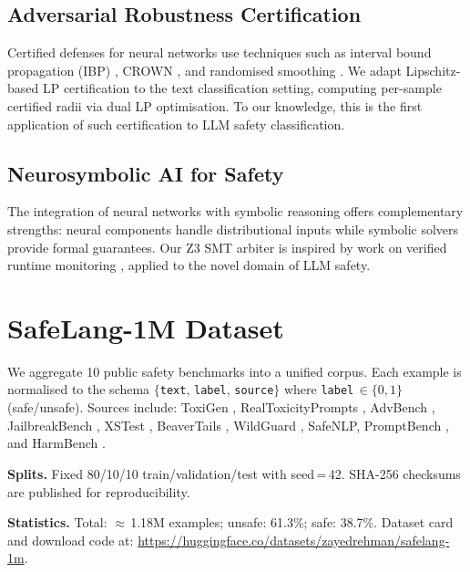 \documentclass[conference]{IEEEtran}
\begin{document}
\subsection{Adversarial Robustness Certification}
Certified defenses for neural networks use techniques such as interval bound
propagation (IBP) \cite{gowal2018effectiveness}, CROWN \cite{zhang2018efficient},
and randomised smoothing \cite{cohen2019certified}. We adapt
Lipschitz-based LP certification \cite{weng2018towards} to the text
classification setting, computing per-sample certified radii via dual LP
optimisation. To our knowledge, this is the first application of such
certification to LLM safety classification.

\subsection{Neurosymbolic AI for Safety}
The integration of neural networks with symbolic reasoning
\cite{garcez2022neural} offers complementary strengths: neural components
handle distributional inputs while symbolic solvers provide formal guarantees.
Our Z3 SMT arbiter is inspired by work on verified runtime monitoring
\cite{pnueli1977temporal}, applied to the novel domain of LLM safety.

\section{SafeLang-1M Dataset}
\label{sec:dataset}

We aggregate 10 public safety benchmarks into a unified corpus. Each example
is normalised to the schema $\{$\texttt{text}, \texttt{label}, \texttt{source}$\}$
where \texttt{label}\,$\in\{0,1\}$ (safe/unsafe). Sources include: ToxiGen
\cite{hartvigsen2022toxigen}, RealToxicityPrompts \cite{gehman2020realtoxicityprompts},
AdvBench \cite{zou2023universal}, JailbreakBench \cite{chao2024jailbreakbench},
XSTest \cite{rottger2023xstest}, BeaverTails \cite{ji2024beavertails},
WildGuard \cite{han2024wildguard}, SafeNLP, PromptBench \cite{zhu2023promptbench},
and HarmBench \cite{mazeika2024harmbench}.

\vspace{2pt}
\noindent\textbf{Splits.} Fixed 80/10/10 train/validation/test with seed\,=\,42.
SHA-256 checksums are published for reproducibility.

\vspace{2pt}
\noindent\textbf{Statistics.}
Total: $\approx$\,1.18M examples; unsafe: 61.3\%; safe: 38.7\%.
Dataset card and download code at: \url{https://huggingface.co/datasets/zayedrehman/safelang-1m}.
\end{document}
